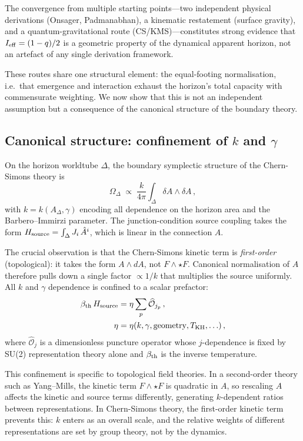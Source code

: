 \documentclass[aps,prd,twocolumn,10pt,superscriptaddress,nofootinbib]{revtex4-2}
\begin{document}
\noindent The convergence from multiple starting
points---two independent physical derivations (Onsager,
Padmanabhan), a kinematic restatement (surface gravity), and a
quantum-gravitational route
(CS/KMS)---constitutes strong evidence that
$I_{\rm eff} = (1-q)/2$ is a geometric property of the dynamical
apparent horizon, not an artefact of any single derivation
framework.

These routes share one structural element: the equal-footing
normalisation, i.e.\ that emergence and interaction exhaust the
horizon's total capacity with commensurate weighting.  We now show
that this is not an independent assumption but a consequence of the
canonical structure of the boundary theory.


\subsection{Canonical structure: confinement of \texorpdfstring{$k$}{k} and \texorpdfstring{$\gamma$}{gamma}}
\label{sec:canonical}

On the horizon worldtube $\Delta$, the boundary symplectic
structure of the Chern-Simons theory is
\begin{equation}
\Omega_\Delta \;\propto\;
  \frac{k}{4\pi}\int_\Delta \delta A \wedge \delta A\,,
\label{eq:symplectic}
\end{equation}
with $k = k(A_\Delta, \gamma)$ encoding all dependence on the
horizon area and the Barbero--Immirzi parameter.  The
junction-condition source coupling takes the form
$H_{\rm source} = \int_\Delta J_i\,\hat{A}^i$, which is linear in
the connection $A$.

The crucial observation is that the Chern-Simons kinetic term is
\emph{first-order} (topological): it takes the form
$A \wedge dA$, not $F \wedge \star F$.  Canonical normalisation
of $A$ therefore pulls down a single factor $\propto 1/k$ that
multiplies the source uniformly.  All $k$ and $\gamma$ dependence
is confined to a scalar prefactor:
\begin{align}
\beta_{\rm th}\,H_{\rm source} &=
  \eta \sum_p \widehat{\mathcal{O}}_{j_p}\,,
\nonumber \\
  \eta &= \eta(k,\gamma,\text{geometry},T_{\rm KH},\ldots)\,,
\label{eq:eta_prefactor}
\end{align}
where $\widehat{\mathcal{O}}_j$ is a dimensionless puncture
operator whose $j$-dependence is fixed by SU(2) representation
theory alone and $\beta_{\rm th}$ is the inverse temperature.

This confinement is specific to topological field theories.  In a
second-order theory such as Yang--Mills, the kinetic term
$F \wedge \star F$ is quadratic in $A$, so rescaling $A$ affects
the kinetic and source terms differently, generating
$k$-dependent ratios between representations.  In Chern-Simons
theory, the first-order kinetic term prevents this: $k$ enters
as an overall scale, and the relative weights of different
representations are set by group theory, not by the dynamics.
\end{document}

